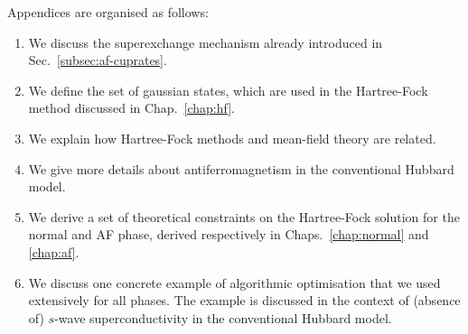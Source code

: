 Appendices are organised as follows:
\begin{enumerate}[align=left]
	\item[App.~\ref{app:superexchange-virtual-hopping}] We discuss the superexchange mechanism already introduced in Sec.~\ref{subsec:af-cuprates}. 
	\item[App.~\ref{app:slater-gaussian}] We define the set of gaussian states, which are used in the Hartree-Fock method discussed in Chap.~\ref{chap:hf}.
	\item[App.~\ref{app:hf-mft}] We explain how Hartree-Fock methods and mean-field theory are related.
	\item[App.~\ref{app:hm-af-ground-state}] We give more details about antiferromagnetism in the conventional Hubbard model.
	\item[App.~\ref{app:theoretical-constraints}] We derive a set of theoretical constraints on the Hartree-Fock solution for the normal and AF phase, derived respectively in Chaps.~\ref{chap:normal} and \ref{chap:af}.
	\item[App.~\ref{app:sc-g-opt}] We discuss one concrete example of algorithmic optimisation that we used extensively for all phases. The example is discussed in the context of (absence of) $s$-wave superconductivity in the conventional Hubbard model.
	\end{enumerate}